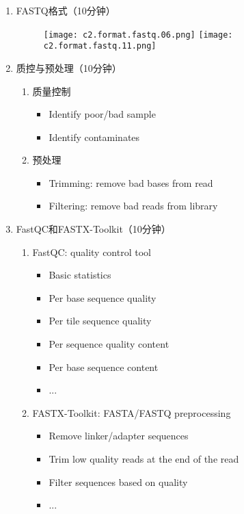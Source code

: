 \documentclass{TIJMUjiaoanSY}
\begin{document}
\noindent
\begin{enumerate}
  \item FASTQ格式（10分钟）
    \begin{figure}[ht]
      \centering
      \texttt{[image: c2.format.fastq.06.png]}
      \texttt{[image: c2.format.fastq.11.png]}
    \end{figure}

  \item 质控与预处理（10分钟）
    \begin{enumerate}
      \item 质量控制
        \begin{itemize}
          \item Identify poor/bad sample
          \item Identify contaminates
        \end{itemize}
      \item 预处理
        \begin{itemize}
          \item Trimming: remove bad bases from read
          \item Filtering: remove bad reads from library
        \end{itemize}
    \end{enumerate}

  \item FastQC和FASTX-Toolkit（10分钟）
    \begin{multicols}{2}
      \begin{enumerate}
        \item FastQC: quality control tool
          \begin{itemize}
            \item Basic statistics
            \item Per base sequence quality
            \item Per tile sequence quality
            \item Per sequence quality content
            \item Per base sequence content
            \item ...
         \end{itemize}
       \item FASTX-Toolkit: FASTA/FASTQ preprocessing
         \begin{itemize}
           \item Remove linker/adapter sequences
           \item Trim low quality reads at the end of the read
           \item Filter sequences based on quality
           \item ...
         \end{itemize}
      \end{enumerate}
    \end{multicols}


\end{enumerate}
\end{document}
